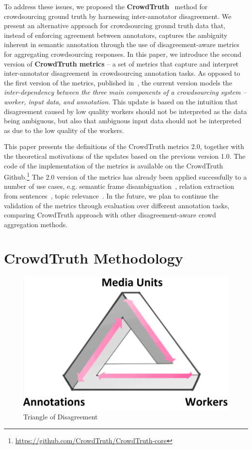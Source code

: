 To address these issues, we proposed the \textbf{CrowdTruth}~\cite{aroyo2015truth} method for crowdsourcing ground truth by harnessing inter-annotator disagreement.  We present an alternative approach for crowdsourcing ground truth data that, instead of enforcing agreement between annotators, captures the ambiguity inherent in semantic annotation through the use of disagreement-aware metrics for aggregating crowdsourcing responses.  In this paper, we introduce the second version of \textbf{CrowdTruth metrics} -- a set of metrics that capture and interpret inter-annotator disagreement in crowdsourcing annotation tasks. As opposed to the first version of the metrics, published in~\cite{inel2014crowdtruth}, the current version models the \textit{inter-dependency between the three main components of a crowdsourcing system -- worker, input data, and annotation}. This update is based on the intuition that disagreement caused by low quality workers should not be interpreted as the data being ambiguous, but also that ambiguous input data should not be interpreted as due to the low quality of the workers.

This paper presents the definitions of the CrowdTruth metrics 2.0, together with the theoretical motivations of the updates based on the previous version 1.0. The code of the implementation of the metrics is available on the CrowdTruth Github.\footnote{\url{https://github.com/CrowdTruth/CrowdTruth-core}} The 2.0 version of the metrics has already been applied successfully to a number of use cases, e.g. semantic frame disambiguation~\cite{DBLP:conf/hcomp/DumitracheAW18}, relation extraction from sentences~\cite{dumitrache2017false}, topic relevance~\cite{inel2018studying}. In the future, we plan to continue the validation of the metrics through evaluation over different annotation tasks, comparing CrowdTruth approach with other disagreement-aware crowd aggregation methods.

\section{CrowdTruth Methodology}

 \begin{figure}[!bth]
 	\centering
 		\includegraphics[width=0.5\linewidth]{img/triangle.png}
 	\caption{Triangle of Disagreement}
 	\label{fig:tor}
 \end{figure}

